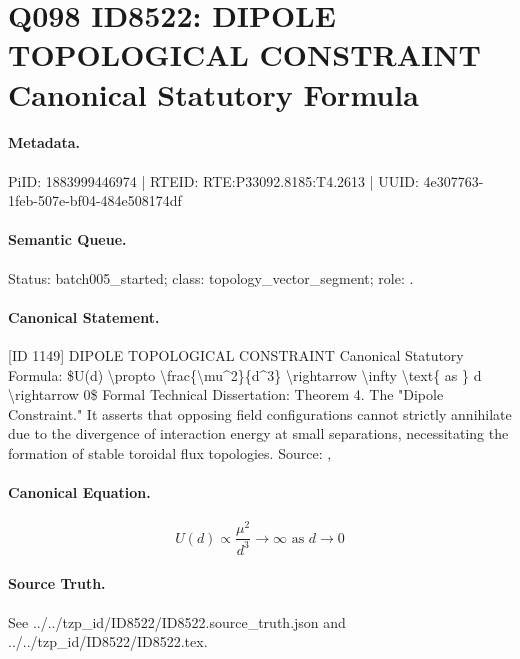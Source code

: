 \section*{Q098 ID8522: DIPOLE TOPOLOGICAL CONSTRAINT Canonical Statutory Formula}
\paragraph{Metadata.}
PiID: 1883999446974 | RTEID: RTE:P33092.8185:T4.2613 | UUID: 4e307763-1feb-507e-bf04-484e508174df

\paragraph{Semantic Queue.}
Status: batch005\_started; class: topology\_vector\_segment; role: .

\paragraph{Canonical Statement.}
[ID 1149] DIPOLE TOPOLOGICAL CONSTRAINT Canonical Statutory Formula: \$U(d) \textbackslash{}propto \textbackslash{}frac\{\textbackslash{}mu\textasciicircum{}2\}\{d\textasciicircum{}3\} \textbackslash{}rightarrow \textbackslash{}infty \textbackslash{}text\{ as \} d \textbackslash{}rightarrow 0\$ Formal Technical Dissertation: Theorem 4. The "Dipole Constraint." It asserts that opposing field configurations cannot strictly annihilate due to the divergence of interaction energy at small separations, necessitating the formation of stable toroidal flux topologies. Source: ,

\paragraph{Canonical Equation.}
\[
U(d) \propto \frac{\mu^2}{d^3} \rightarrow \infty \text{ as } d \rightarrow 0
\]

\paragraph{Source Truth.}
See ../../tzp\_id/ID8522/ID8522.source\_truth.json and ../../tzp\_id/ID8522/ID8522.tex.
